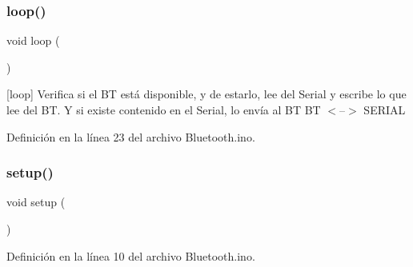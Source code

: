 \subsubsection{\texorpdfstring{loop()}{loop()}}
{\footnotesize\ttfamily void loop (\begin{DoxyParamCaption}{ }\end{DoxyParamCaption})}

\mbox{[}loop\mbox{]} Verifica si el BT está disponible, y de estarlo, lee del Serial y escribe lo que lee del BT. Y si existe contenido en el Serial, lo envía al BT BT $<$--$>$ S\+E\+R\+I\+AL 

Definición en la línea 23 del archivo Bluetooth.\+ino.

\mbox{\label{_bluetooth_8ino_a4fc01d736fe50cf5b977f755b675f11d}} 
\subsubsection{\texorpdfstring{setup()}{setup()}}
{\footnotesize\ttfamily void setup (\begin{DoxyParamCaption}{ }\end{DoxyParamCaption})}



Definición en la línea 10 del archivo Bluetooth.\+ino.

